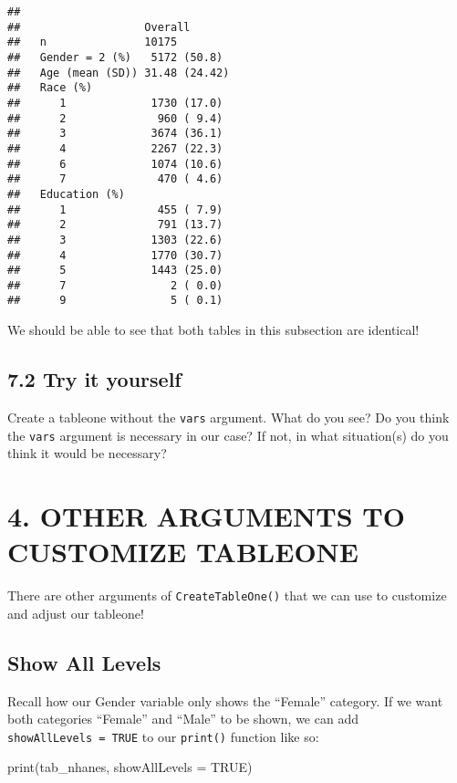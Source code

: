 \documentclass[
]{book}
\newenvironment{Shaded}{\begin{snugshade}}{\end{snugshade}}
\newcommand{\AttributeTok}[1]{\textcolor[rgb]{0.77,0.63,0.00}{#1}}
\newcommand{\ConstantTok}[1]{\textcolor[rgb]{0.00,0.00,0.00}{#1}}
\newcommand{\FunctionTok}[1]{\textcolor[rgb]{0.00,0.00,0.00}{#1}}
\newcommand{\NormalTok}[1]{#1}
\begin{document}
\begin{verbatim}
##
##                   Overall
##   n               10175
##   Gender = 2 (%)   5172 (50.8)
##   Age (mean (SD)) 31.48 (24.42)
##   Race (%)
##      1             1730 (17.0)
##      2              960 ( 9.4)
##      3             3674 (36.1)
##      4             2267 (22.3)
##      6             1074 (10.6)
##      7              470 ( 4.6)
##   Education (%)
##      1              455 ( 7.9)
##      2              791 (13.7)
##      3             1303 (22.6)
##      4             1770 (30.7)
##      5             1443 (25.0)
##      7                2 ( 0.0)
##      9                5 ( 0.1)
\end{verbatim}

We should be able to see that both tables in this subsection are identical!

\hypertarget{try-it-yourself-35}{%
\subsection{7.2 Try it yourself}\label{try-it-yourself-35}}

Create a tableone without the \texttt{vars} argument. What do you see?
Do you think the \texttt{vars} argument is necessary in our case? If not, in what situation(s) do you think it would be necessary?

\hypertarget{other-arguments-to-customize-tableone}{%
\section{4. OTHER ARGUMENTS TO CUSTOMIZE TABLEONE}\label{other-arguments-to-customize-tableone}}

There are other arguments of \texttt{CreateTableOne()} that we can use to customize and adjust our tableone!

\hypertarget{show-all-levels}{%
\subsection{Show All Levels}\label{show-all-levels}}

Recall how our Gender variable only shows the ``Female'' category. If we want both categories ``Female'' and ``Male'' to be shown, we can add \texttt{showAllLevels\ =\ TRUE} to our \texttt{print()} function like so:

\begin{Shaded}
\begin{Highlighting}[]
\FunctionTok{print}\NormalTok{(tab\_nhanes, }
      \AttributeTok{showAllLevels =} \ConstantTok{TRUE}\NormalTok{)}
\end{Highlighting}
\end{Shaded}
\end{document}
